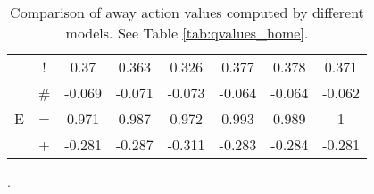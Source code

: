 \documentclass{sfuthesis}
\begin{document}
\begin{table}
\begin{tabular}{cccccccc}
			& \multicolumn{1}{c|}{!}      & 0.37               & 0.363               & 0.326             & 0.377          & \multicolumn{1}{c|}{0.378}              & 0.371         \\
			& \multicolumn{1}{c|}{\#}     & -0.069             & -0.071              & -0.073            & -0.064         & \multicolumn{1}{c|}{-0.064}             & -0.062        \\ \hline
			E      & \multicolumn{1}{c|}{=}      & 0.971              & 0.987               & 0.972             & 0.993          & \multicolumn{1}{c|}{0.989}              & 1             \\
			& \multicolumn{1}{c|}{+}      & -0.281             & -0.287              & -0.311            & -0.283         & \multicolumn{1}{c|}{-0.284}             & -0.281       
		\end{tabular}
		\caption{Comparison of away action values computed by different models. See Table \ref{tab:qvalues_home}.}.
		\label{tab:qvalues_away}
	\end{table}
	
\end{document}
